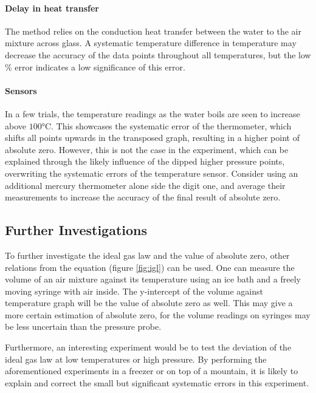 \documentclass[a4paper,12pt]{article}
\begin{document}
\paragraph{Delay in heat transfer}
The method relies on the conduction heat transfer between the water to the air mixture across glass. A systematic temperature difference in temperature may decrease the accuracy of the data points throughout all temperatures, but the low \% error indicates a low significance of this error.

\paragraph{Sensors}
In a few trials, the temperature readings as the water boils are seen to increase above $100\si{\celsius}$. This showcases the systematic error of the thermometer, which shifts all points upwards in the transposed graph, resulting in a higher point of absolute zero. However, this is not the case in the experiment, which can be explained through the likely influence of the dipped higher pressure points, overwriting the systematic errors of the temperature sensor. Consider using an additional mercury thermometer alone side the digit one, and average their measurements to increase the accuracy of the final result of absolute zero.

\subsection{Further Investigations}
To further investigate the ideal gas law and the value of absolute zero, other relations from the equation (figure \ref{fig:igl}) can be used. One can measure the volume of an air mixture against its temperature using an ice bath and a freely moving syringe with air inside. The y-intercept of the volume against temperature graph will be the value of absolute zero as well. This may give a more certain estimation of absolute zero, for the volume readings on syringes may be less uncertain than the pressure probe.

Furthermore, an interesting experiment would be to test the deviation of the ideal gas law at low temperatures or high pressure. By performing the aforementioned experiments in a freezer or on top of a mountain, it is likely to explain and correct the small but significant systematic errors in this experiment.

\newpage
\nocite{*}
\printbibliography


\newpage
\end{document}
